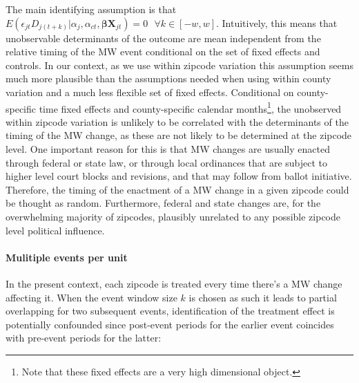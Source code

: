The main identifying assumption is that $E \left( \epsilon_{jt} D_{j(t+k)} | \alpha_j, \alpha_{ct}, \boldsymbol{\beta} \boldsymbol{X}_{jt}\right)  = 0  \ \ \ \forall k\in[-w, w]$. Intuitively, this means that unobservable determinants of the outcome are mean independent from the relative timing of the MW event conditional on the set of fixed effects and controls. In our context, as we use within zipcode variation this assumption seems much more plausible than the assumptions needed when using within county variation and a much less flexible set of fixed effects. Conditional on county-specific time fixed effects and county-specific calendar months\footnote{Note that these fixed effects are a very high dimensional object.}, the unobserved within zipcode variation is unlikely to be correlated with the determinants of the timing of the MW change, as these are not likely to be determined at the zipcode level. One important reason for this is that MW changes are usually enacted through federal or state law, or through local ordinances that are subject to higher level court blocks and revisions, and that may follow from ballot initiative. Therefore, the timing of the enactment of a MW change in a given zipcode could be thought as random. Furthermore, federal and state changes are, for the overwhelming majority of zipcodes, plausibly unrelated to any possible zipcode level political influence. 

\paragraph{Mulitiple events per unit}
In the present context, each zipcode is treated every time there's a MW change affecting it. When the event window size $k$ is chosen as such it leads to partial overlapping for two subsequent events, identification of the treatment effect is potentially confounded since post-event periods for the earlier event coincides with pre-event periods for the latter: 


\begin{center}
\end{center}

